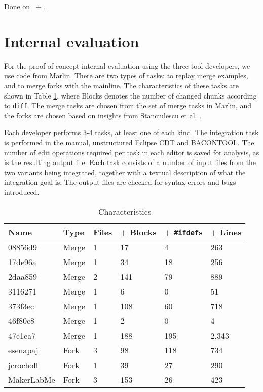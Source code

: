 Done on \busybox~+ \vim.

\section{Internal evaluation}
For the proof-of-concept internal evaluation using the three tool developers, we use code from Marlin. There are two types of tasks: to replay merge examples, and to merge forks with the mainline. The characteristics of these tasks are shown in Table \ref{tab:internalchar}, where Blocks denotes the number of changed chunks according to \texttt{diff}. The merge tasks are chosen from the set of merge tasks in Marlin, and the forks are chosen based on insights from Stanciulescu et al. \cite{stanciulescu2015}.

Each developer performs 3-4 tasks, at least one of each kind. The integration task is performed in the manual, unstructured Eclipse CDT and BACONTOOL. The number of edit operations required per task in each editor is saved for analysis, as is the resulting output file. Each task consists of a number of input files from the two variants being integrated, together with a textual description of what the integration goal is. The output files are checked for syntax errors and bugs introduced.

\begin{table}[h]
    \centering
    \caption{Characteristics}
    \label{tab:internalchar}
    \begin{tabular}{lll|lll}
\hline\hline
\textbf{Name} & \textbf{Type} & \textbf{Files} & \textbf{$\pm$ Blocks} & \textbf{$\pm$ \texttt{\#ifdef}s} & \textbf{$\pm$ Lines} \\
\hline
08856d9      & Merge     & 1 & 17    & 4     & 263   \\
17de96a      & Merge     & 1 & 34    & 18    & 256   \\
2daa859      & Merge     & 2 & 141 & 79      & 889   \\
3116271      & Merge     & 1 & 6     & 0     & 51    \\
373f3ec      & Merge     & 1 & 108 & 60      & 718   \\
46f80e8      & Merge     & 1 & 2     & 0     & 4     \\
47c1ea7      & Merge     & 1 & 188   & 195   & 2,343 \\
\hline
esenapaj     & Fork         & 3 & 98    & 118   & 734   \\
jcrocholl    & Fork         & 1 & 39    & 27    & 290   \\
MakerLabMe   & Fork         & 3 & 153   & 26    & 423   \\
\hline\hline
    \end{tabular}
\end{table}

